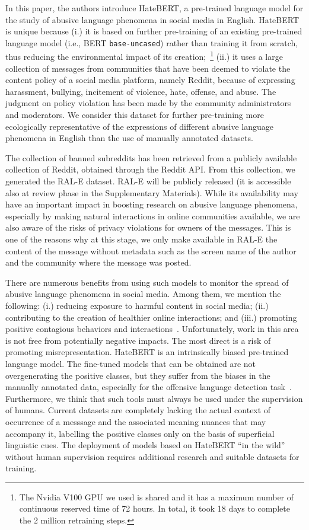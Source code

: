 \documentclass[11pt]{article}
\begin{document}
In this paper, the authors introduce HateBERT, a pre-trained language model for the study of abusive language phenomena in social media in English. HateBERT is unique because (i.) it is based on further pre-training of an existing pre-trained language model (i.e., BERT \texttt{base-uncased}) rather than training it from scratch, thus reducing the environmental impact of its creation;~\footnote{The Nvidia V100 GPU we used is shared and it has a maximum number of continuous reserved time of 72 hours. In total, it took 18 days to complete the 2 million retraining steps.} (ii.) it uses a large collection of messages from communities that have been deemed to violate the content policy of a social media platform, namely Reddit, because of expressing harassment, bullying, incitement of violence, hate, offense, and abuse. The judgment on policy violation has been made by the community administrators and moderators. We consider this dataset for further pre-training more ecologically representative of the expressions of different abusive language phenomena in English than the use of manually annotated datasets. 

The collection of banned subreddits has been retrieved from a publicly available collection of Reddit, obtained through the Reddit API. From this collection, we generated the RAL-E dataset. RAL-E will be publicly released (it is accessible also at review phase in the Supplementary Materials). While its availability may have an important impact in boosting research on abusive language phenomena, especially by making natural interactions in online communities available, we are also aware of the risks of privacy violations for owners of the messages. This is one of the reasons why at this stage, we only make available in RAL-E the content of the message without metadata such as the screen name of the author and the community where the message was posted. 

There are numerous benefits from using such models to monitor the spread of abusive language phenomena in social media. Among them, we mention the following: (i.) reducing exposure to harmful content in social media; (ii.) contributing to the creation of healthier online interactions; and (iii.) promoting positive contagious behaviors and interactions~\cite{matias2019preventing}. Unfortunately, work in this area is not free from potentially negative impacts. The most direct is a risk of promoting misrepresentation. HateBERT is an intrinsically biased pre-trained language model. The fine-tuned models that can be obtained are not overgenerating the positive classes, but they suffer from the biases in the manually annotated data, especially for the offensive language detection task~\cite{sap-etal-2019-risk,davidson-etal-2019-racial}. Furthermore, we think that such tools must always be used under the supervision of humans. Current datasets are completely lacking the actual context of occurrence of a messsage and the associated meaning nuances that may accompany it, labelling the positive classes only on the basis of superficial linguistic cues. The deployment of models based on HateBERT ``in the wild'' without human supervision requires additional research and suitable datasets for training.
\end{document}
